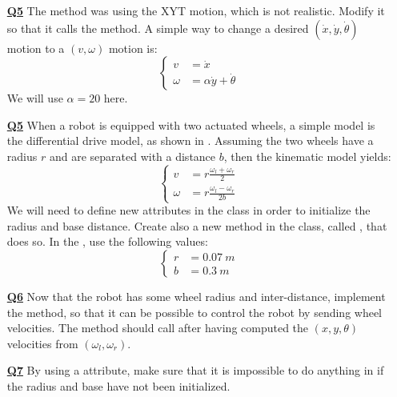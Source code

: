 \documentclass{ecnreport}
\begin{document}
\begin{itemize}
\medskip\item[\textbf{\underline{Q5}}] The  method was using the XYT motion, which is not realistic. 
Modify it so that it calls the  method. A simple way to change a desired $(\dot x, \dot y, \dot \theta)$ motion
to a $(v, \omega)$ motion is:
\begin{equation*}\left\{\begin{array}{ll}
 v& = \dot x\\
 \omega &= \alpha\dot y + \dot \theta\end{array}\right.
\end{equation*}We will use $\alpha = 20$ here.

\medskip\item[\textbf{\underline{Q5}}] When a robot is equipped with two actuated wheels, a simple model is the differential drive model, as shown in . Assuming the two wheels have a radius $r$ and are separated with a distance $b$, then the kinematic model yields:
\begin{equation*}\label{eq:dk}
\left\{\begin{array}{ll}
v &= \displaystyle r \frac{\omega_l + \omega_r}{2} \\
\omega &= \displaystyle r \frac{\omega_l - \omega_r}{2b}
\end{array}\right.
\end{equation*}
We will need to define new attributes in the  class in order to initialize the radius and base distance.
Create also a new method in the  class, called , that does so. In the , use the following values:
\begin{equation*}
\left\{\begin{array}{ll}
r &= 0.07 ~m \\
b &= 0.3 ~m
\end{array}\right.
\end{equation*}

\medskip\item[\textbf{\underline{Q6}}] Now that the robot has some wheel radius and inter-distance, implement the  method, so that it can be possible to control the robot by sending wheel velocities. 
The method should call  after having computed the $(x,y,\theta)$ velocities from $(\omega_l, \omega_r)$.

\medskip\item[\textbf{\underline{Q7}}] By using a  attribute, make sure that it is impossible to do anything in  if the radius and base have not been initialized.


\end{itemize}
\end{document}
